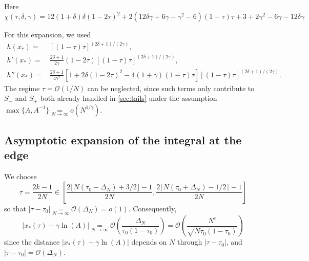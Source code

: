 \documentclass[pdflatex,sn-mathphys-num]{sn-jnl}
\theoremstyle{thmstyleone}
\numberwithin{equation}{section}
\begin{document}
\noindent Here
\begin{equation}\label{chi.def}
\chi(\tau,\delta,\gamma)=12(1+\delta)\delta(1-2\tau)^2+2(12 \delta\gamma+6\gamma-\gamma^2-6)(1-\tau)\tau+3+2\gamma^2-6\gamma-12\delta\gamma
\end{equation}


For this expansion, we used
\begin{equation}\label{h.expan}
\begin{split}
h(x_*)=&[(1-\tau)\tau]^{(2\delta+1)/(2\gamma)},\\
h'(x_*)=&\frac{2\delta+1}{2\gamma}(1-2\tau)[(1-\tau)\tau]^{(2\delta+1)/(2\gamma)},\\
h''(x_*)=&\frac{2\delta+1}{4\gamma^2}[1+2\delta(1-2\tau)^2-4(1+\gamma)(1-\tau)\tau][(1-\tau)\tau]^{(2\delta+1)/(2\gamma)}.
\end{split}
\end{equation}
The regime $\tau=\mathcal{O}(1/N)$ can be neglected, since such terms only contribute to $S_{-}$ and $S_{+}$ both already handled in \autoref{sec:tails} under the assumption $\max\{A,A^{-1}\}\underset{N\to\infty}{=}o(N^{1/\gamma})$.


\subsection{Asymptotic expansion of the integral at the edge}\label{sec:edge}


We choose
\begin{equation}\label{edge.int}
\tau=\frac{2k-1}{2N}\in\left[\frac{2\lfloor N(\tau_0-\Delta_N)+3/2\rfloor-1}{2N},\frac{2\lceil N(\tau_0+\Delta_N)-1/2\rceil-1}{2N}\right]
\end{equation}
so that $|\tau-\tau_0|\underset{N\to \infty}{=}\mathcal{O}(\Delta_N)=o(1)$. 
Consequently,
\begin{equation}\label{x.dist}
|x_*(\tau)-\gamma\ln(A)|\underset{N\to \infty}{=}\mathcal{O}\left(\frac{\Delta_N}{\tau_0(1-\tau_0)}\right)=\mathcal{O}\left(\frac{N^\varepsilon}{\sqrt{N\tau_0(1-\tau_0)}}\right)
\end{equation}
since the distance $\left|x_*(\tau)-\gamma\ln(A)\right|$ depends on $N$ through $\left|\tau-\tau_{0}\right|$, and $\left|\tau-\tau_{0}\right|=\mathcal{O}(\Delta_{N})$. 
\end{document}
